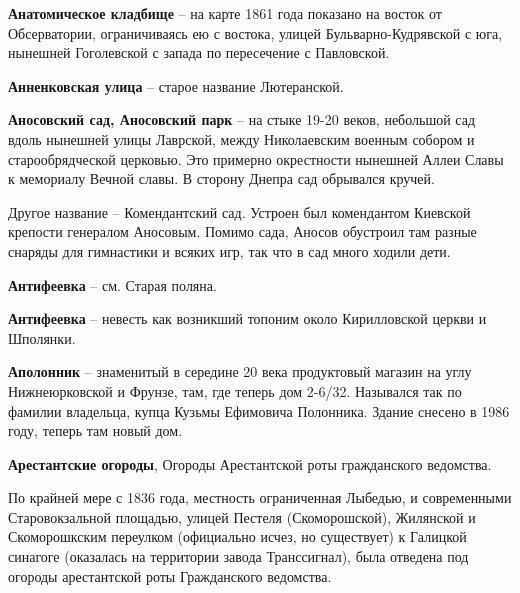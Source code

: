 \medskip


\textbf{Анатомическое кладбище} – на карте 1861 года показано на восток от Обсерватории, ограничиваясь ею с востока, улицей Бульварно-Кудрявской с юга, нынешней Гоголевской с запада по пересечение с Павловской.

\medskip


\textbf{Анненковская улица} – старое название Лютеранской.\\

\medskip


\textbf{Аносовский сад, Аносовский парк} – на стыке 19-20 веков, небольшой сад вдоль нынешней улицы Лаврской, между Николаевским военным собором и старообрядческой церковью. Это примерно окрестности нынешней Аллеи Славы к мемориалу Вечной славы. В сторону Днепра сад обрывался кручей.

Другое название – Комендантский сад. Устроен был комендантом Киевской крепости генералом Аносовым. Помимо сада, Аносов обустроил там разные снаряды для гимнастики и всяких игр, так что в сад много ходили дети.\\ 

\medskip


\textbf{Антифеевка} – см. Старая поляна.\\

\medskip


\textbf{Антифеевка} – невесть как возникший топоним около Кирилловской церкви и Шполянки.\\

\medskip



\textbf{Аполонник} – знаменитый в середине 20 века продуктовый магазин на углу Нижнеюрковской и Фрунзе, там, где теперь дом 2-6/32. Назывался так по фамилии владельца, купца Кузьмы Ефимовича Полонника. Здание снесено в 1986 году, теперь там новый дом.\\

\medskip


\textbf{Арестантские огороды}, Огороды Арестантской роты гражданского ведомства.

По крайней мере с 1836 года, местность ограниченная Лыбедью, и современными Старовокзальной площадью, улицей Пестеля (Скоморошской), Жилянской и Скоморошкским переулком (официально исчез, но существует) к Галицкой синагоге (оказалась на территории завода Транссигнал), была отведена под огороды арестантской роты Гражданского ведомства.

